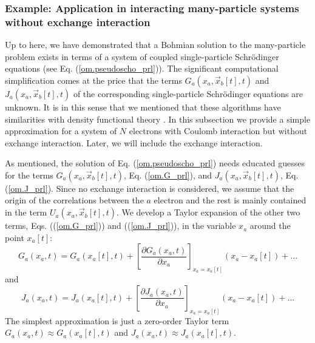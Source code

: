 \documentclass[onecolumn,nofootinbib, secnumarabic, amsmath, nobibnotes,11pt,aps,pra]{revtex4-1}
\newcommand{\pref}[1]{(\ref{#1})}
\newcommand{\eref}[1]{Eq. (\ref{#1})}
\begin{document}
\subsubsection{Example: Application in interacting many-particle systems without exchange interaction}

Up to here, we have demonstrated that a Bohmian solution to the
many-particle problem exists in terms of a system of coupled
single-particle Schr\"odinger equations (see
\eref{om.pseudoscho_prl}). The significant computational
simplification comes at the price that the terms
\textit{$G_{a}(x_{a},\vec x_{b}[t],t)$} and
\textit{$J_{a}(x_{a},\vec x_{b}[t],t)$} of the corresponding
single-particle Schr\"odinger equations are unknown. It is in this
sense that we mentioned that these algorithms have similarities with
density functional theory \cite{om.kohn1964,om.kohn1965}. In this
subsection we provide a simple approximation for a system of $N$
electrons with Coulomb interaction but without exchange interaction.
Later, we will include the exchange interaction.

As mentioned, the solution of \eref{om.pseudoscho_prl} needs
educated guesses for the terms \textit{$G_{a}(x_{a},\vec
x_{b}[t],t)$}, \eref{om.G_prl}, and \textit{$J_{a}(x_{a},\vec
x_{b}[t],t)$}, \eref{om.J_prl}. Since no exchange interaction is
considered, we assume that the origin of the correlations between the $a$ electron and the rest is
mainly contained in the term \textit{$U_{a}(x_{a},\vec
x_{b}[t],t)$}. We develop  a Taylor expansion of the other two terms, Eqs.
(\pref{om.G_prl}) and (\pref{om.J_prl}), in the variable $x_a$
around the point $x_a[t]$:
\begin{equation}
\label{om.G_prl_taylor}
G_{a}(x_a,t) = G_{a}(x_a[t],t) + \left[\frac {\partial G_{a}(x_a,t)} {\partial x_a} \right]_{x_a = x_a[t]}(x_a-x_a[t]) + \ldots
\end{equation}
and
\begin{equation}
\label{om.J_prl_taylor}
J_{a}(x_a,t) = J_{a}(x_a[t],t) + \left[\frac {\partial J_{a}(x_a,t)} {\partial x_a}\right]_{x_a = x_a[t]} (x_a-x_a[t]) + \ldots
\end{equation}
The simplest approximation is just a zero-order Taylor term \textit{$G_{a}(x_a,t) \approx G_{a}(x_a[t],t)$} and \textit{$J_{a}(x_a,t) \approx J_{a}(x_a[t],t)$}.
\end{document}
